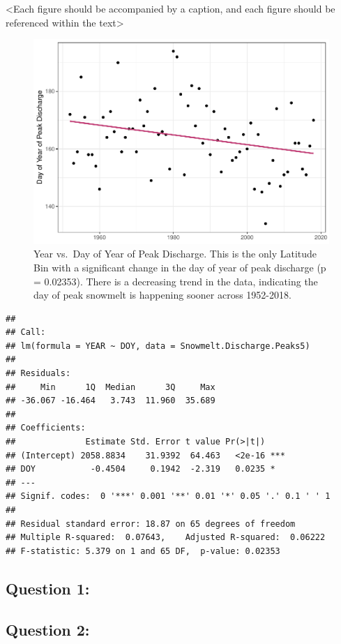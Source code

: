 \documentclass[12pt,]{article}
\begin{document}
\textless{}Each figure should be accompanied by a caption, and each
figure should be referenced within the text\textgreater{}

\begin{figure}
\centering
\includegraphics{Project_Report_v2_files/figure-latex/unnamed-chunk-6-1.pdf}
\caption{Year vs.~Day of Year of Peak Discharge. This is the only
Latitude Bin with a significant change in the day of year of peak
discharge (p = 0.02353). There is a decreasing trend in the data,
indicating the day of peak snowmelt is happening sooner across
1952-2018.}
\end{figure}

\begin{verbatim}
## 
## Call:
## lm(formula = YEAR ~ DOY, data = Snowmelt.Discharge.Peaks5)
## 
## Residuals:
##     Min      1Q  Median      3Q     Max 
## -36.067 -16.464   3.743  11.960  35.689 
## 
## Coefficients:
##              Estimate Std. Error t value Pr(>|t|)    
## (Intercept) 2058.8834    31.9392  64.463   <2e-16 ***
## DOY           -0.4504     0.1942  -2.319   0.0235 *  
## ---
## Signif. codes:  0 '***' 0.001 '**' 0.01 '*' 0.05 '.' 0.1 ' ' 1
## 
## Residual standard error: 18.87 on 65 degrees of freedom
## Multiple R-squared:  0.07643,    Adjusted R-squared:  0.06222 
## F-statistic: 5.379 on 1 and 65 DF,  p-value: 0.02353
\end{verbatim}

\hypertarget{question-1}{%
\subsection{Question 1: }\label{question-1}}

\hypertarget{question-2}{%
\subsection{Question 2:}\label{question-2}}
\end{document}
